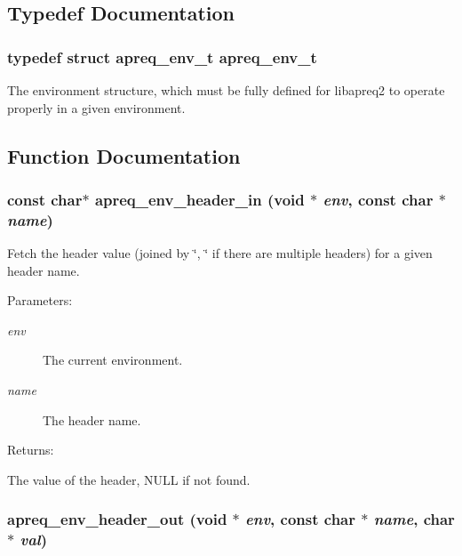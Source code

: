 \subsection{Typedef Documentation}
\subsubsection{\setlength{\rightskip}{0pt plus 5cm}typedef struct apreq\_\-env\_\-t  apreq\_\-env\_\-t}\label{group__ENV_a0}


The environment structure, which must be fully defined for libapreq2 to operate properly in a given environment. 

\subsection{Function Documentation}
\subsubsection{\setlength{\rightskip}{0pt plus 5cm}const char$\ast$ apreq\_\-env\_\-header\_\-in ({\bf void} $\ast$ {\em env}, const char $\ast$ {\em name})}\label{group__ENV_a6}


Fetch the header value (joined by \char`\"{}, \char`\"{} if there are multiple headers) for a given header name. \begin{Desc}
\item[Parameters: ]\par
\begin{description}
\item[{\em 
env}]The current environment. \item[{\em 
name}]The header name. \end{description}
\end{Desc}
\begin{Desc}
\item[Returns: ]\par
The value of the header, NULL if not found. \end{Desc}
\subsubsection{ apreq\_\-env\_\-header\_\-out ({\bf void} $\ast$ {\em env}, const char $\ast$ {\em name}, char $\ast$ {\em val})}\label{group__ENV_a7}


